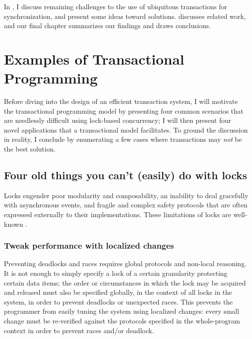 In , I discuss remaining challenges to the use of
ubiquitous transactions for synchronization, and present some ideas
toward solutions.  discusses related work, and our
final chapter summarizes our findings and draws conclusions.


\chapter{Examples of Transactional Programming}\label{cha:examples}

Before diving into the design of an efficient transaction system,
I will motivate the transactional programming model by
presenting four common scenarios that are needlessly
difficult using lock-based concurrency; I will then present four novel
applications that a transactional model facilitates.  To ground the
discussion in reality, I conclude by enumerating a few cases where
transactions may \emph{not} be the best solution.

\section{Four old things you can't (easily) do with locks}
Locks engender poor modularity and composability, an inability to deal
gracefully with asynchronous events, and fragile and complex safety
protocols that are often expressed externally to their
implementations.  These limitations of locks are well-known
\cite{Herlihy05}.

\subsection{Tweak performance with localized changes}
Preventing deadlocks and races requires global protocols and non-local
reasoning.  It is not enough to simply specify a lock of a certain
granularity protecting certain data items; the order or circumstances
in which the lock may be acquired and released must also be specified
globally, in the context of all locks in the system, in order to
prevent deadlocks or unexpected races.  This prevents the programmer
from easily tuning the system using localized changes: every small
change must be re-verified against the protocols specified in the
whole-program context in order to prevent races and/or deadlock.

